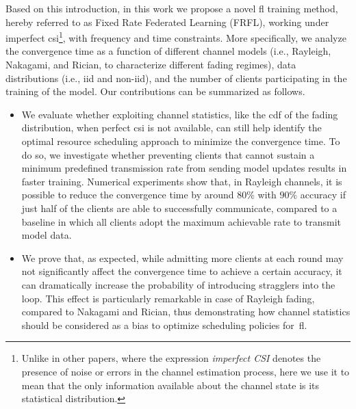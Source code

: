 \documentclass[10pt, conference, letterpaper]{IEEEtran}
\begin{document}
	Based on this introduction, in this work we propose a novel \gls{fl} training method, hereby referred to as Fixed Rate Federated Learning (FRFL), working under imperfect \gls{csi}\footnote{Unlike in other papers, where the expression \textit{imperfect CSI} denotes the presence of noise or errors in the channel estimation process, here we use it to mean that the only information available about the channel state is its statistical distribution.}, with frequency and time constraints. 
	More specifically, we analyze the convergence time as a function of different channel models (i.e., Rayleigh, Nakagami, and Rician, to characterize different fading regimes), data distributions (i.e., iid and non-iid), and the number of clients participating in the training of the model.
	Our contributions can be summarized as follows.
	\begin{itemize}
		\item We evaluate whether exploiting channel statistics, like the \gls{cdf} of the fading distribution, when perfect \gls{csi} is not available, can still help identify the optimal resource scheduling approach to minimize the convergence time. To do so, we investigate whether preventing clients that cannot sustain a minimum predefined transmission rate from sending model updates results in faster training.
		Numerical experiments show that, in Rayleigh channels, it is possible to reduce the convergence time by around $80\%$ with $90\%$ accuracy  if just half of the clients are able to successfully communicate, compared to a baseline in which all clients adopt the maximum achievable rate to transmit model data.
		
		
		\item We prove that, as expected, while admitting more clients at each round may not significantly affect the convergence time to achieve a certain accuracy, it can dramatically increase the probability of introducing stragglers into the loop. This effect is particularly remarkable in case of Rayleigh fading, compared to Nakagami and Rician, thus demonstrating how channel statistics should be considered as a bias to optimize scheduling policies for~\gls{fl}.
		
	\end{itemize}
	
\end{document}
